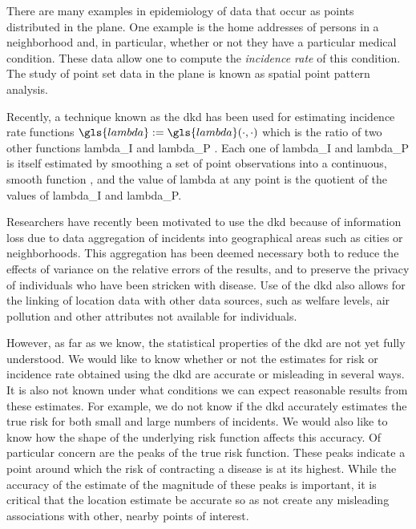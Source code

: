 

There are many examples in epidemiology of data that occur as points distributed in the plane.
One example is
the home addresses of persons in a neighborhood and,
in particular, whether or not they have a particular medical condition.
These data allow one to compute the \textit{\gls{incidence rate}} of this condition.
The study of point set data in the plane is known as spatial point pattern analysis.

Recently, a technique known as the \gls{dkd} has been used for estimating \gls{incidence rate} functions
$\gls{lambda} := \gls{lambda}\dotdot$
which is the ratio of two other functions \gls{lambda_I} and \gls{lambda_P} \citep{portnov2009studying,kloog2009using,zusman2012residential}.
Each one of \gls{lambda_I} and \gls{lambda_P} is itself estimated by smoothing a set of point observations into a continuous,
smooth function \citep{bithell1990application},
and the value of \gls{lambda} at any point is the quotient of the values of
\gls{lambda_I} and \gls{lambda_P}.

Researchers have recently been motivated to use the \gls{dkd} because of information loss
due to data aggregation of incidents into geographical areas such as cities or neighborhoods.
This aggregation has been deemed necessary both
to reduce the effects of variance on the relative errors of the results,
and to preserve the privacy of individuals who have been stricken with disease.
Use of the \gls{dkd} also allows for the linking of location data with other data sources,
such as welfare levels, air pollution and other attributes not available for individuals.

However,
as far as we know,
the statistical properties of the \gls{dkd} are not yet fully understood.
We would like to know whether or not the estimates for \gls{risk} or \gls{incidence rate}
obtained using the \gls{dkd} are accurate or misleading in several ways.
It is also not known under what conditions we can expect reasonable results from these estimates.
For example,
we do not know if the \gls{dkd} accurately estimates the true \gls{risk}
for both small and large numbers of incidents.
We would also like to know how the shape of the underlying \gls{risk} function affects this accuracy.
Of particular concern are the peaks of the true risk function.
These peaks indicate a point around which the risk of contracting a disease is at its highest.
While the accuracy of the estimate of the magnitude of these peaks is important,
it is critical that the location estimate be accurate so as not create any misleading associations
with other, nearby points of interest.

